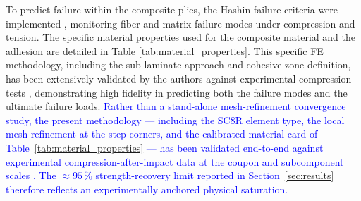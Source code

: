 \documentclass[
  preprint,
  12pt,
  a4paper
]{elsarticle}
\newcommand{\new}[1]{\textcolor{blue}{#1}}
\begin{document}
To predict failure within the composite plies, the Hashin failure criteria were implemented \cite{hashin1980failure}, monitoring fiber and matrix failure modes under compression and tension. The specific material properties used for the composite material and the adhesion are detailed in Table \ref{tab:material_properties}. This specific FE methodology, including the sub-laminate approach and cohesive zone definition, has been extensively validated by the authors against experimental compression tests \cite{psarras2020evaluating, psarras2023evaluating}, demonstrating high fidelity in predicting both the failure modes and the ultimate failure loads. \new{Rather than a stand-alone mesh-refinement convergence study, the present methodology --- including the SC8R element type, the local mesh refinement at the step corners, and the calibrated material card of Table~\ref{tab:material_properties} --- has been validated end-to-end against experimental compression-after-impact data at the coupon and subcomponent scales \cite{psarras2024design, psarras2020evaluating, psarras2023evaluating}. The $\approx 95\,\%$ strength-recovery limit reported in Section~\ref{sec:results} therefore reflects an experimentally anchored physical saturation.}
\end{document}
